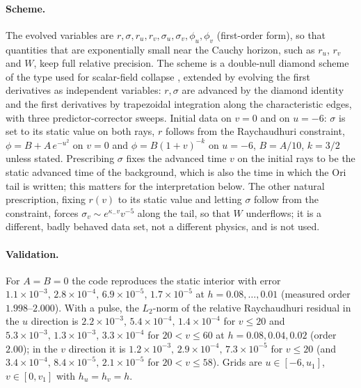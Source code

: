 \documentclass[11pt]{article}
\begin{document}
\paragraph{Scheme.} The evolved variables are $r,\sigma,r_u,r_v,\sigma_u,\sigma_v,\phi_u,\phi_v$ (first-order form), so that quantities that are exponentially small near the Cauchy horizon, such as $r_u$, $r_v$ and $W$, keep full relative precision. The scheme is a double-null diamond scheme of the type used for scalar-field collapse \citep{GundlachPricePullin1994}, extended by evolving the first derivatives as independent variables: $r,\sigma$ are advanced by the diamond identity and the first derivatives by trapezoidal integration along the characteristic edges, with three predictor-corrector sweeps. Initial data on $v=0$ and on $u=-6$: $\sigma$ is set to its static value on both rays, $r$ follows from the Raychaudhuri constraint, $\phi=B+A\,e^{-u^2}$ on $v=0$ and $\phi=B(1+v)^{-k}$ on $u=-6$, $B=A/10$, $k=3/2$ unless stated. Prescribing $\sigma$ fixes the advanced time $v$ on the initial rays to be the static advanced time of the background, which is also the time in which the Ori tail is written; this matters for the interpretation below. The other natural prescription, fixing $r(v)$ to its static value and letting $\sigma$ follow from the constraint, forces $\sigma_v\sim e^{\kappa_-v}v^{-5}$ along the tail, so that $W$ underflows; it is a different, badly behaved data set, not a different physics, and is not used.

\paragraph{Validation.} For $A=B=0$ the code reproduces the static interior with error $1.1\times10^{-3},\,2.8\times10^{-4},\,6.9\times10^{-5},\,1.7\times10^{-5}$ at $h=0.08,\dots,0.01$ (measured order $1.998$--$2.000$). With a pulse, the $L_2$-norm of the relative Raychaudhuri residual in the $u$ direction is $2.2\times10^{-3},\,5.4\times10^{-4},\,1.4\times10^{-4}$ for $v\le20$ and $5.3\times10^{-3},\,1.3\times10^{-3},\,3.3\times10^{-4}$ for $20<v\le60$ at $h=0.08,0.04,0.02$ (order $2.00$); in the $v$ direction it is $1.2\times10^{-3},\,2.9\times10^{-4},\,7.3\times10^{-5}$ for $v\le20$ (and $3.4\times10^{-4},\,8.4\times10^{-5},\,2.1\times10^{-5}$ for $20<v\le58$). Grids are $u\in[-6,u_1]$, $v\in[0,v_1]$ with $h_u=h_v=h$.
\end{document}
